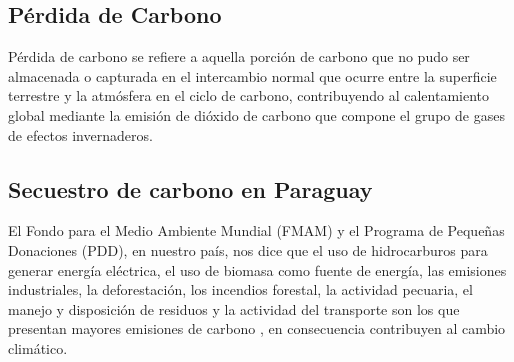 \subsection{P\'erdida de Carbono}
P\'erdida de carbono se refiere a aquella porci\'on de carbono que no pudo ser almacenada o capturada en el intercambio normal que ocurre entre la superficie terrestre y la atm\'osfera en el ciclo de carbono, contribuyendo al calentamiento global mediante la emisión de di\'oxido de carbono que compone el grupo de gases de efectos invernaderos.
\subsection{Secuestro de carbono en Paraguay}
El Fondo para el Medio Ambiente Mundial (FMAM) y el Programa de Peque\~{n}as Donaciones (PDD), en nuestro pa\'is, nos dice que el uso de hidrocarburos para generar energ\'ia el\'ectrica, el uso de biomasa como fuente de energ\'ia, las emisiones industriales, la deforestaci\'on, los incendios forestal, la actividad pecuaria, el manejo y disposici\'on de residuos y la actividad del transporte son los que presentan mayores emisiones de carbono \cite{cecilia2010Proyecto}, en consecuencia contribuyen al cambio clim\'atico.
